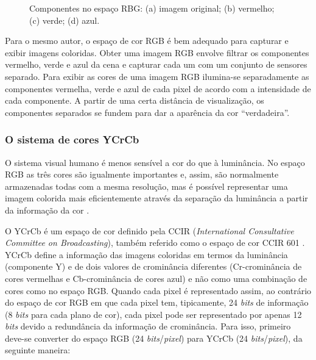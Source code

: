 \begin{figure}
{    }
	\qquad
    \caption{Componentes no espaço RBG: (a) imagem original; (b) vermelho; (c) verde; (d) azul.}%
	    
    \label{fig:RGB}%
\end{figure}

Para o mesmo autor, o espaço de cor RGB é bem adequado para capturar e exibir imagens coloridas. Obter uma imagem RGB envolve filtrar os componentes vermelho, verde e azul da cena e capturar cada um com um conjunto de sensores separado. Para exibir as cores de uma imagem RGB ilumina-se separadamente as componentes vermelha, verde e azul de cada pixel de acordo com a intensidade de cada componente. A partir de uma certa distância de visualização, os componentes separados se fundem para dar a aparência da cor \enquote{verdadeira}. 

\subsubsection{O sistema de cores YCrCb}
O sistema visual humano é menos sensível a cor do que à luminância. No espaço RGB as três cores são igualmente importantes e, assim, são normalmente armazenadas todas com a mesma resolução, mas é possível representar uma imagem colorida mais eficientemente através da separação da luminância a partir da informação da cor \cite{richardson2011h}.

O YCrCb é um espaço de cor definido pela CCIR (\textit{International Consultative Committee on Broadcasting}), também referido como o espaço de cor CCIR 601 \cite{acharya2002integrated}. YCrCb define a informação  das imagens coloridas  em termos da luminância (componente Y) e de dois valores de crominância diferentes (Cr-crominância de cores vermelhas e Cb-crominância de cores azul) e não como uma combinação de cores como no espaço RGB. Quando cada pixel é representado assim, ao contrário do espaço de cor RGB em que cada pixel tem, tipicamente, 24 \textit{bits} de informação (8 \textit{bits} para cada plano de cor), cada pixel pode ser representado por apenas 12 \textit{bits} devido a redundância da informação de crominância. Para isso, primeiro deve-se converter do espaço RGB (24 \textit{bits}/\textit{pixel}) para YCrCb (24 \textit{bits}/\textit{pixel}), da seguinte maneira:

